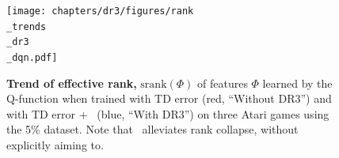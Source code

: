 \fi


\begin{figure}[h]
    \centering
    \vspace{-0.1in}
    \texttt{[image: chapters/dr3/figures/rank\\\_trends\\\_dr3\\\_dqn.pdf]}
    \vspace{-0.1in}
    \caption{\footnotesize{{\textbf{Trend of effective rank,} $\mathrm{srank}(\Phi)$ of features $\Phi$ learned by the Q-function when trained with TD error (red, ``Without DR3'') and with TD error + \drmethodname\ (blue, ``With DR3'') on three Atari games using the 5\% dataset. Note that \drmethodname\ alleviates rank collapse, without explicitly aiming to.}}}
    \label{fig:iup_is_fixed}
\end{figure}

